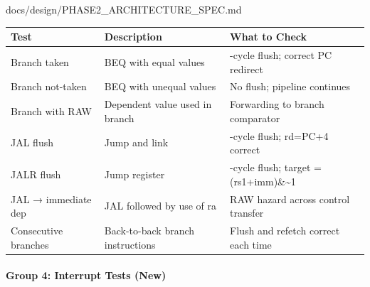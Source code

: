 \begin{relocated}{docs/design/PHASE2_ARCHITECTURE_SPEC.md}
{
\begin{longtable}[]{@{}
  >{\raggedright\arraybackslash}p{}
  >{\raggedright\arraybackslash}p{}
  >{\raggedright\arraybackslash}p{}@{}}
\toprule\noalign{}
\begin{minipage}[b]{\linewidth}\raggedright
Test
\end{minipage} & \begin{minipage}[b]{\linewidth}\raggedright
Description
\end{minipage} & \begin{minipage}[b]{\linewidth}\raggedright
What to Check
\end{minipage} \\
\midrule\noalign{}
\endhead
\bottomrule\noalign{}
\endlastfoot
Branch taken & BEQ with equal values & 2-cycle flush; correct PC
redirect \\
Branch not-taken & BEQ with unequal values & No flush; pipeline
continues \\
Branch with RAW & Dependent value used in branch & Forwarding to branch
comparator \\
JAL flush & Jump and link & 1-cycle flush; rd=PC+4 correct \\
JALR flush & Jump register & 2-cycle flush; target =
(rs1+imm)\&\textasciitilde1 \\
JAL → immediate dep & JAL followed by use of ra & RAW hazard across
control transfer \\
Consecutive branches & Back-to-back branch instructions & Flush and
refetch correct each time \\
\end{longtable}
}

\paragraph{Group 4: Interrupt Tests (New)}\label{ds:ch:phase2-architecture:group-4-interrupt-tests-new}


\end{relocated}
